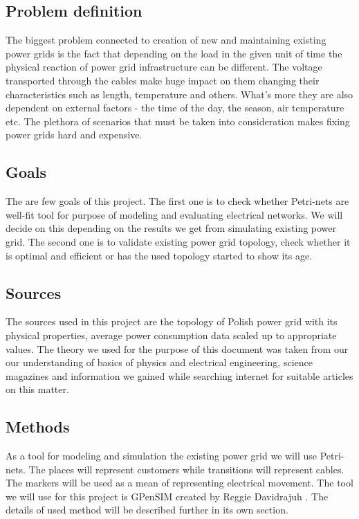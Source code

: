 \documentclass[a4paper]{article}
\begin{document}
\subsection{Problem definition}
\label{sec:problemDefinition}

The biggest problem connected to creation of new and maintaining existing power grids is the fact that depending on the load in the given unit of time the physical reaction of power grid infrastructure can be different. The voltage transported through the cables make huge impact on them changing their characteristics such as length, temperature and others. What's more they are also dependent on external factors - the time of the day, the season, air temperature etc. The plethora of scenarios that must be taken into consideration makes fixing power grids hard and expensive.

\subsection{Goals} 
\label{sec:goals}

The are few goals of this project. The first one is to check whether Petri-nets are well-fit tool for purpose of modeling and evaluating electrical networks. We will decide on this depending on the results we get from simulating existing power grid. The second one is to validate existing power grid topology, check whether it is optimal and efficient or has the used topology started to show its age. 

\subsection{Sources}
\label{sec:sources}

The sources used in this project are the topology of Polish power grid with its physical properties, average power consumption data scaled up to appropriate values. The theory we used for the purpose of this document was taken from our our understanding of basics of physics and electrical engineering, science magazines and information we gained while searching internet for suitable articles on this matter.

\subsection{Methods}
\label{sec:methods}

As a tool for modeling and simulation the existing power grid we will use Petri-nets. The places will represent customers while transitions will represent cables. The markers will be used as a mean of representing electrical movement. The tool we will use for this project is GPenSIM created by Reggie Davidrajuh \cite{Art2}. The details of used method will be described further in its own section.
\end{document}
